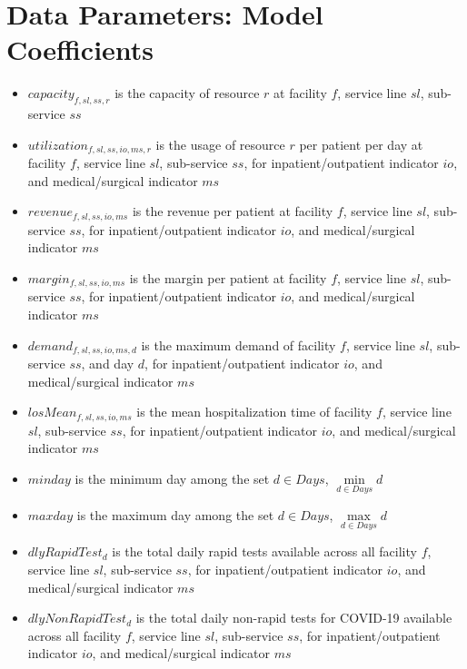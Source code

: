 \documentclass[10pt, letterpaper]{article}
\begin{document}
\section*{Data Parameters: Model Coefficients}
\begin{itemize}
\item[ ] $capacity_{f,sl,ss,r}$  is the capacity of resource $r$ at facility $f$, service line $sl$, sub-service $ss$
\item[ ] $utilization_{f,sl,ss,io,ms,r}$ is the usage of resource $r$ per patient per day at facility $f$, service line $sl$, sub-service $ss$, for inpatient/outpatient indicator $io$, and medical/surgical indicator $ms$
\item[ ] $revenue_{f,sl,ss,io,ms}$  is the revenue per patient at facility $f$, service line $sl$, sub-service $ss$, for inpatient/outpatient indicator $io$, and medical/surgical indicator $ms$
\item[ ] $margin_{f,sl,ss,io,ms}$  is the margin per patient at facility $f$, service line $sl$, sub-service $ss$, for inpatient/outpatient indicator $io$, and medical/surgical indicator $ms$
\item[ ] $demand_{f,sl,ss,io,ms,d}$ is the maximum demand of facility $f$, service line $sl$, sub-service $ss$, and day $d$, for inpatient/outpatient indicator $io$, and medical/surgical indicator $ms$
\item[ ] $losMean_{f,sl,ss,io,ms}$  is the mean hospitalization time of facility $f$, service line $sl$, sub-service $ss$, for inpatient/outpatient indicator $io$, and medical/surgical indicator $ms$
\item[ ] $minday$ is the minimum day among the set $ d \in Days$, ${\min\limits_{d \in Days} d}$
\item[ ] $maxday$ is the maximum day among the set $ d \in Days$, ${\max\limits_{d \in Days} d}$
\item[ ] $dlyRapidTest_{d}$ is the total daily rapid tests available across all facility $f$, service line $sl$, sub-service $ss$, for inpatient/outpatient indicator $io$, and medical/surgical indicator $ms$ 
\item[ ] $dlyNonRapidTest_{d}$ is the total daily non-rapid tests for COVID-19 available across all facility $f$, service line $sl$, sub-service $ss$, for inpatient/outpatient indicator $io$, and medical/surgical indicator $ms$ 

\pagebreak


\end{itemize}
\end{document}
